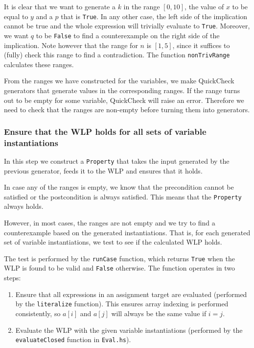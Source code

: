 \documentclass[a4paper]{article}
\begin{document}
It is clear that we want to generate a $k$ in the range $[0, 10]$, the value of
$x$ to be equal to $y$ and a $p$ that is \texttt{True}. In any other case, the
left side of the implication cannot be true and the whole expression will
trivially evaluate to \texttt{True}. Moreover, we want $q$ to be \texttt{False}
to find a counterexample on the right side of the implication. Note however that
the range for $n$ is $[1, 5]$, since it suffices to (fully) check this range to
find a contradiction. The function \texttt{nonTrivRange} calculates these
ranges.

From the ranges we have constructed for the variables, we make QuickCheck
generators that generate values in the corresponding ranges. If the range turns
out to be empty for some variable, QuickCheck will raise an error. Therefore
we need to check that the ranges are non-empty before turning them into generators.

\subsubsection*{Ensure that the WLP holds for all sets of variable instantiations}

In this step we construct a \texttt{Property} that takes the input generated by
the previous generator, feeds it to the WLP and ensures that it holds.

In case any of the ranges is empty, we know that the precondition cannot be
satisfied or the postcondition is always satisfied. This means that the
\texttt{Property} always holds. 

However, in most cases, the ranges are not empty and we try to find a counterexample
based on the generated instantiations. That is, for each generated set of variable
instantiations, we test to see if the calculated WLP holds.

The test is performed by the \texttt{runCase} function, which returns \texttt{True}
when the WLP is found to be valid and \texttt{False} otherwise. The function
operates in two steps:

\begin{enumerate}
\item Ensure that all expressions in an assignment target are evaluated (performed
by the \texttt{literalize} function). This ensures array indexing is performed
consistently, so $a[i]$ and $a[j]$ will always be the same value if $i = j$.
\item Evaluate the WLP with the given variable instantiations (performed by the
\texttt{evaluateClosed} function in \texttt{Eval.hs}).
\end{enumerate}
\end{document}
